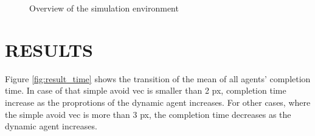 \documentclass[letterpaper, 10 pt, conference]{ieeeconf}  %
\begin{document}
\begin{figure}[thpb]
   \centering
   \caption{Overview of the simulation environment}
   \label{fig:sim_env}
\end{figure}

\section{RESULTS} 
Figure \ref{fig:result_time} shows the transition of the mean of all agents' completion time. In case of that simple avoid vec is smaller than 2 px, completion time increase as the proprotions of the dynamic agent increases. For other cases, where the simple avoid vec is more than 3 px, the completion time decreases as the dynamic agent increases.
\end{document}

